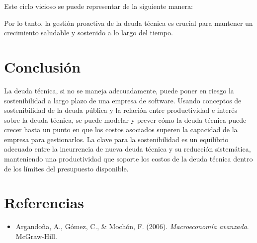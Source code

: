 \documentclass[12pt]{article}
\begin{document}
Este ciclo vicioso se puede representar de la siguiente manera:

\begin{center}
\end{center}

Por lo tanto, la gestión proactiva de la deuda técnica es crucial para mantener un crecimiento saludable y sostenido a lo largo del tiempo.


\section{Conclusión}

La deuda técnica, si no se maneja adecuadamente, puede poner en riesgo la sostenibilidad a largo plazo de una empresa de software. 
Usando conceptos de sostenibilidad de la deuda pública y la relación entre productividad e interés sobre la deuda técnica, se puede modelar y prever 
cómo la deuda técnica puede crecer hasta un punto en que los costos asociados superen la capacidad de la empresa para gestionarlos. 
La clave para la sostenibilidad es un equilibrio adecuado entre la incurrencia de nueva deuda técnica y su reducción sistemática, manteniendo una productividad 
que soporte los costos de la deuda técnica dentro de los límites del presupuesto disponible.

\section{Referencias}
\begin{itemize}
    \item Argandoña, A., Gómez, C., \& Mochón, F. (2006). \textit{Macroeconomía avanzada}. McGraw-Hill.
\end{itemize}
\end{document}
